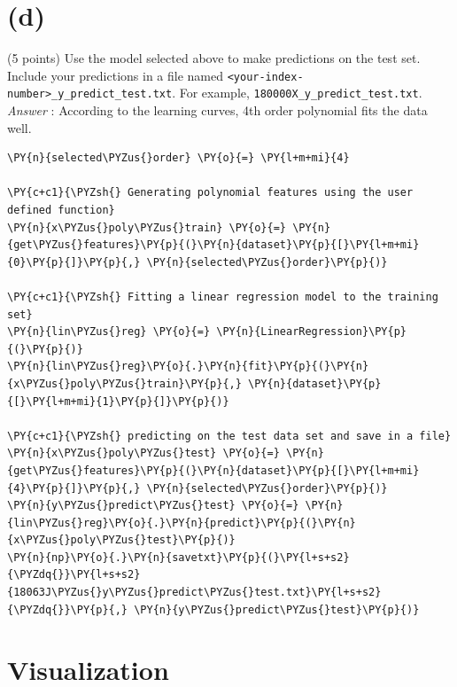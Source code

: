 \documentclass[a4paper,11pt]{article}%
\begin{document}
    \hypertarget{d}{%
\section{(d)}\label{d}}

(5 points) Use the model selected above to make predictions on the test
set. Include your predictions in a file named
\texttt{\textless{}your-index-number\textgreater{}\_y\_predict\_test.txt}.
For example, \texttt{180000X\_y\_predict\_test.txt}.\\

\emph{Answer} : According to the learning curves, 4th order polynomial
fits the data well.

    \begin{tcolorbox}[breakable, size=fbox, boxrule=1pt, pad at break*=1mm,colback=cellbackground, colframe=cellborder]
\begin{Verbatim}[commandchars=\\\{\}]
\PY{n}{selected\PYZus{}order} \PY{o}{=} \PY{l+m+mi}{4}

\PY{c+c1}{\PYZsh{} Generating polynomial features using the user defined function}
\PY{n}{x\PYZus{}poly\PYZus{}train} \PY{o}{=} \PY{n}{get\PYZus{}features}\PY{p}{(}\PY{n}{dataset}\PY{p}{[}\PY{l+m+mi}{0}\PY{p}{]}\PY{p}{,} \PY{n}{selected\PYZus{}order}\PY{p}{)}

\PY{c+c1}{\PYZsh{} Fitting a linear regression model to the training set}
\PY{n}{lin\PYZus{}reg} \PY{o}{=} \PY{n}{LinearRegression}\PY{p}{(}\PY{p}{)}
\PY{n}{lin\PYZus{}reg}\PY{o}{.}\PY{n}{fit}\PY{p}{(}\PY{n}{x\PYZus{}poly\PYZus{}train}\PY{p}{,} \PY{n}{dataset}\PY{p}{[}\PY{l+m+mi}{1}\PY{p}{]}\PY{p}{)}

\PY{c+c1}{\PYZsh{} predicting on the test data set and save in a file}
\PY{n}{x\PYZus{}poly\PYZus{}test} \PY{o}{=} \PY{n}{get\PYZus{}features}\PY{p}{(}\PY{n}{dataset}\PY{p}{[}\PY{l+m+mi}{4}\PY{p}{]}\PY{p}{,} \PY{n}{selected\PYZus{}order}\PY{p}{)}
\PY{n}{y\PYZus{}predict\PYZus{}test} \PY{o}{=} \PY{n}{lin\PYZus{}reg}\PY{o}{.}\PY{n}{predict}\PY{p}{(}\PY{n}{x\PYZus{}poly\PYZus{}test}\PY{p}{)}
\PY{n}{np}\PY{o}{.}\PY{n}{savetxt}\PY{p}{(}\PY{l+s+s2}{\PYZdq{}}\PY{l+s+s2}{18063J\PYZus{}y\PYZus{}predict\PYZus{}test.txt}\PY{l+s+s2}{\PYZdq{}}\PY{p}{,} \PY{n}{y\PYZus{}predict\PYZus{}test}\PY{p}{)}
\end{Verbatim}
\end{tcolorbox}
\pagebreak
    \hypertarget{visualization}{%
\section{Visualization}\label{visualization}}
\end{document}
